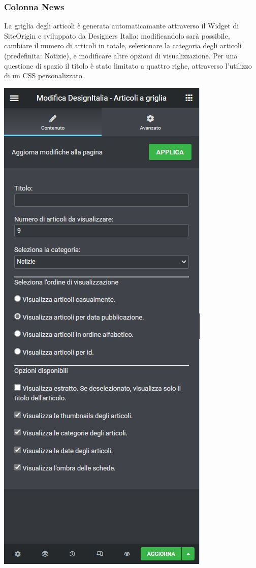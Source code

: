 \documentclass{article}
\begin{document}
	\subsubsection{\textbf{Colonna News}}
	La griglia degli articoli è generata automaticamante attraverso il Widget di SiteOrigin e sviluppato da Designers Italia: modificandolo sarà possibile, cambiare il numero di articoli in totale, selezionare la categoria degli articoli (predefinita: Notizie), e modificare altre opzioni di visualizzazione.
	Per una questione di spazio il titolo è stato limitato a quattro righe, attraverso l'utilizzo di un CSS personalizzato.
	\begin{center}
		\includegraphics[scale=0.2]{Modifica articoli a griglia.jpeg}
	\end{center}
\end{document}
